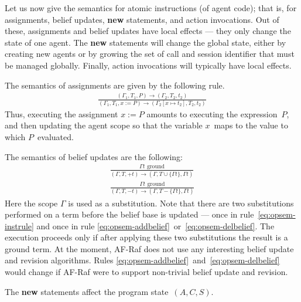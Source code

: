 \documentclass[a4paper,12pt,oneside,fleqn]{book} %
\begin{document}
{Let us now give the semantics for atomic instructions (of agent code); that
is, for assignments, belief updates, {\bf new} statements, and action
invocations.  Out of these, assignments and belief updates have local
effects --- they only change the state of one agent. The {\bf new}
statements will change the global state, either by creating new agents or
by growing the set of call and session identifier that must be managed
globally. Finally, action invocations will typically have local effects.

The semantics of assignments are given by the following rule.
\begin{align}
\frac
  {(\Gamma_1,T_1,P)\to(\Gamma_2,T_2,t_2)}
  {(\Gamma_1,T_1,x:=P)\to(\Gamma_2[x\mapsto t_2],T_2,t_2)}
\end{align}
Thus, executing the assignment $x:=P$ amounts to executing the
expression~$P$, and then updating the agent scope so that the variable
$x$~maps to the value to which $P$~evaluated.

The semantics of belief updates are the following:
\begin{align}
\frac
  {\text{$\Gamma t$ ground}}
  {(\Gamma,T,+t)\to(\Gamma,T\cup\{\Gamma t\},\Gamma t)}
  \label{eq:opsem-addbelief}
\\[1ex]
\frac
  {\text{$\Gamma t$ ground}}
  {(\Gamma,T,-t)\to(\Gamma,T-\{\Gamma t\},\Gamma t)}
  \label{eq:opsem-delbelief}
\end{align}
Here the scope $\Gamma$ is used as a substitution. Note that there are two
substitutions performed on a term before the belief base is updated ---
once in rule~\eqref{eq:opsem-instrule} and once in rule
\eqref{eq:opsem-addbelief}~or~\eqref{eq:opsem-delbelief}. The execution
proceeds only if after applying these two substitutions the result is a
ground term. At the moment, AF-Raf does not use any interesting belief
update and revision algorithms. Rules
\eqref{eq:opsem-addbelief}~and~\eqref{eq:opsem-delbelief} would change if
AF-Raf were to support non-trivial belief update and revision.

The {\bf new} statements affect the program state~$(A,C,S)$.

}
\end{document}
